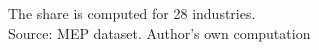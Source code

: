 \documentclass[12pt]{article}
\begin{document}
\begin{table}[hbt]
{\begin{threeparttable}
\begin{tabular}{l*{2}{c}}
\hline
\end{tabular}
\begin{tablenotes}
      \small
      \item The share is computed for 28 industries. \\
      Source: MEP dataset. Author's own computation 
    \end{tablenotes}
    \label{tab:so2share}
\end{threeparttable}}
\end{table}
\end{document}
